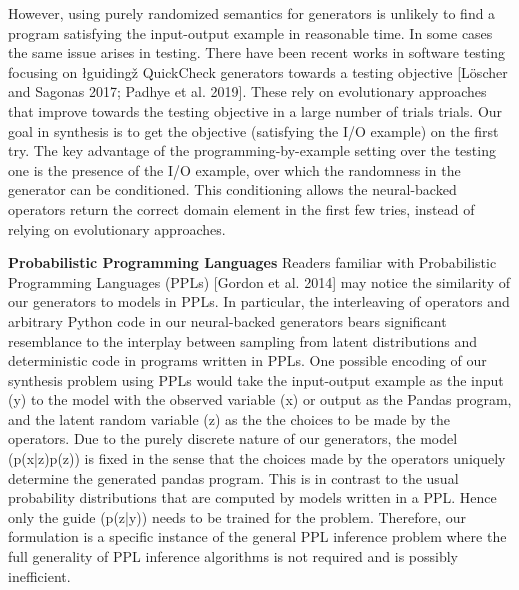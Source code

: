 \documentclass{article}
\begin{document}
However, using purely randomized semantics for generators is unlikely to find a program satisfying the input-output example in reasonable time. In some cases the same issue arises in testing. There have been recent works in software testing focusing on łguidingž QuickCheck generators towards a testing objective [Löscher and Sagonas 2017; Padhye et al. 2019]. These rely on evolutionary approaches that improve towards the testing objective in a large number of trials trials. Our goal in synthesis is to get the objective (satisfying the I/O example) on the first try. The key advantage of the programming-by-example setting over the testing one is the presence of the I/O example, over which the randomness in the generator can be conditioned. This conditioning allows the neural-backed operators return the correct domain element in the first few tries, instead of relying on evolutionary approaches.

\textbf{Probabilistic Programming Languages}
Readers familiar with Probabilistic Programming Languages (PPLs) [Gordon et al. 2014] may notice the similarity of our generators to models in PPLs. In particular, the interleaving of operators and arbitrary Python code in our neural-backed generators bears significant resemblance to the interplay between sampling from latent distributions and deterministic code in programs written in PPLs. One possible encoding of our synthesis problem using PPLs would take the input-output example as the input (y) to the model with the observed variable (x) or output as the Pandas program, and the latent random variable (z) as the the choices to be made by the operators. Due to the purely discrete nature of our generators, the model (p(x|z)p(z)) is fixed in the sense that the choices made by the operators uniquely determine the generated pandas program. This is in contrast to the usual probability distributions that are computed by models written in a PPL. Hence only the guide (p(z|y)) needs to be trained for the problem. Therefore, our formulation is a specific instance of the general PPL inference problem where the full generality of PPL inference algorithms is not required and is possibly inefficient.
\end{document}

